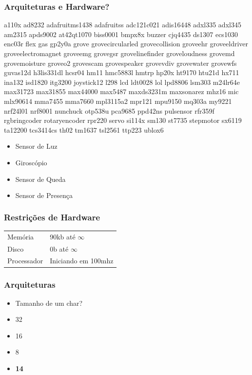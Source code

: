 \documentclass{beamer}
\begin{document}
\begin{frame} \frametitle{Arquiteturas e Hardware?}

a110x ad8232 adafruitms1438 adafruitss adc121c021 adis16448 adxl335 adxl345
am2315 apds9002 at42qt1070 biss0001 bmpx8x buzzer cjq4435 ds1307 ecs1030
enc03r flex gas gp2y0a grove grovecircularled grovecollision groveehr groveeldriver
groveelectromagnet groveemg grovegsr grovelinefinder groveloudness grovemd
grovemoisture groveo2 grovescam grovespeaker grovevdiv grovewater grovewfs
guvas12d h3lis331dl hcsr04 hm11 hmc5883l hmtrp hp20x ht9170 htu21d hx711 ina132
isd1820 itg3200 joystick12 l298 lcd ldt0028 lol lpd8806 lsm303 m24lr64e max31723
max31855 max44000 max5487 maxds3231m maxsonarez mhz16 mic mlx90614 mma7455 mma7660
mpl3115a2 mpr121 mpu9150 mq303a my9221 nrf24l01 nrf8001 nunchuck otp538u
pca9685 ppd42ns pulsensor rfr359f rgbringcoder rotaryencoder rpr220 servo si114x
sm130 st7735 stepmotor sx6119 ta12200 tcs3414cs th02 tm1637 tsl2561 ttp223 ublox6

\end{frame}

\begin{frame}
 \begin{itemize}
  \item Sensor de Luz
  \item Giroscópio
  \item Sensor de Queda
  \item Sensor de Presença
 \end{itemize}
\end{frame}

\begin{frame} \frametitle{ Restrições de Hardware}
  \begin{center}
\begin{tabular}{ll}
    Memória & 90kb até $ \infty $\\
    Disco & 0b até $ \infty $\\
    Processador & Iniciando em 100mhz
 \end{tabular}
 \end{center}
\end{frame}

\begin{frame} \frametitle{Arquiteturas}
    \begin{itemize}
    \item Tamanho de um char?
    \pause
    \linebreak
    \item 32
    \item 16
    \item 8
    \pause
    \linebreak
    \item \textbf{14}
    \end{itemize}
\end{frame}
\end{document}

